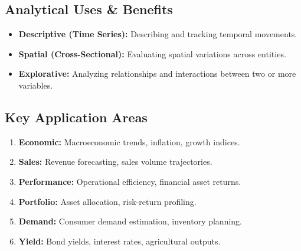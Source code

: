\subsection{Analytical Uses \& Benefits}
\begin{itemize}[leftmargin=*]
    \item \textbf{Descriptive (Time Series):} Describing and tracking temporal movements.
    \item \textbf{Spatial (Cross-Sectional):} Evaluating spatial variations across entities.
    \item \textbf{Explorative:} Analyzing relationships and interactions between two or more variables.
\end{itemize}

\subsection{Key Application Areas}
\begin{enumerate}[leftmargin=*, noitemsep]
    \item \textbf{Economic:} Macroeconomic trends, inflation, growth indices.
    \item \textbf{Sales:} Revenue forecasting, sales volume trajectories.
    \item \textbf{Performance:} Operational efficiency, financial asset returns.
    \item \textbf{Portfolio:} Asset allocation, risk-return profiling.
    \item \textbf{Demand:} Consumer demand estimation, inventory planning.
    \item \textbf{Yield:} Bond yields, interest rates, agricultural outputs.
\end{enumerate}

